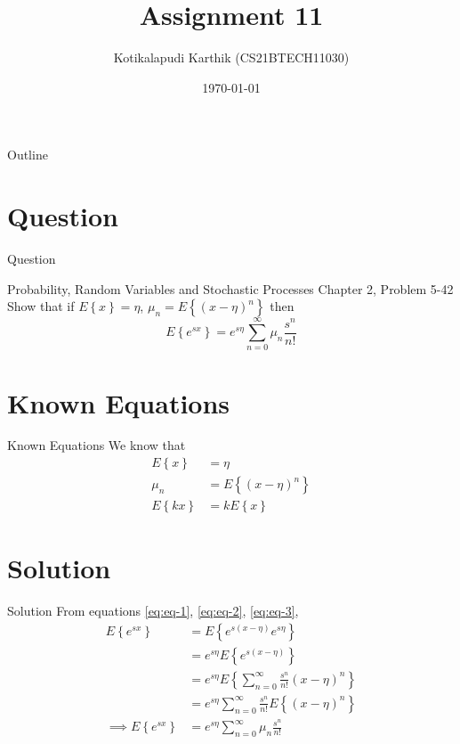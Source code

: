 \documentclass{beamer}
\title{Assignment 11}
\author{Kotikalapudi Karthik (CS21BTECH11030)}
\date{\today}
\providecommand{\brak}[1]{\ensuremath{\left(#1\right)}}
\providecommand{\cbrak}[1]{\ensuremath{\left\{#1\right\}}}
\begin{document}
\begin{frame}
    \titlepage 
\end{frame}

\logo{}


\begin{frame}{Outline}
    \tableofcontents
\end{frame}

\section{Question}
\begin{frame}{Question}
    \begin{block}{Probability, Random Variables and Stochastic Processes Chapter 2, Problem 5-42}  
        Show that if $E\cbrak{x}=\eta$, $\mu_n = E\cbrak{\brak{x-\eta}^n}$ then $$E\cbrak{e^{sx}}=e^{s\eta}\sum^{\infty}_{n=0}\mu_n\frac{s^n}{n!}$$
    \end{block}
\end{frame}

\section{Known Equations}
\begin{frame}{Known Equations}
    We know that 
    \begin{align}
        E\cbrak{x} &= \eta
        \label{eq:eq-1}
        \\
        \mu_n &= E\cbrak{\brak{x-\eta}^n}
        \label{eq:eq-2}
        \\
        E\cbrak{kx} &= kE\cbrak{x}
        \label{eq:eq-3}
    \end{align}
\end{frame}

\section{Solution}
\begin{frame}{Solution}
    From equations \eqref{eq:eq-1}, \eqref{eq:eq-2}, \eqref{eq:eq-3},
    \begin{align}
        E\cbrak{e^{sx}} &= E\cbrak{e^{s\brak{x-\eta}}e^{s\eta}}
        \\
        &= e^{s\eta}E\cbrak{e^{s\brak{x-\eta}}}
        \\
        &= e^{s\eta}E\cbrak{\sum^{\infty}_{n=0}\frac{s^n}{n!}\brak{x-\eta}^n}
        \\
        &= e^{s\eta}\sum^{\infty}_{n=0}\frac{s^n}{n!}E\cbrak{\brak{x-\eta}^n}
        \\
        \implies E\cbrak{e^{sx}}&= e^{s\eta}\sum^{\infty}_{n=0}\mu_n\frac{s^n}{n!}
    \end{align}
\end{frame}
\end{document}
